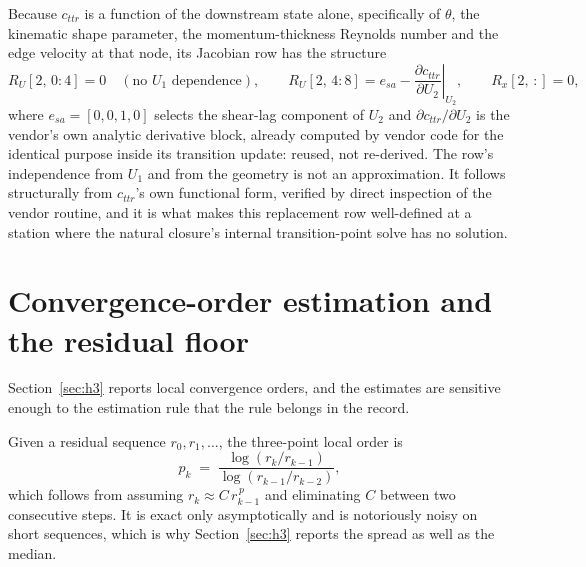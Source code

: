 Because $c_{ttr}$ is a function of the downstream state alone, specifically of
$\theta$, the kinematic shape parameter, the momentum-thickness Reynolds
number and the edge velocity at that node, its Jacobian row has the structure
\begin{equation}
  R_U[2,\,0{:}4] = 0 \quad(\text{no } U_1 \text{ dependence}), \qquad
  R_U[2,\,4{:}8] = e_{sa} - \left.\frac{\partial c_{ttr}}{\partial U_2}\right|_{U_2},
  \qquad R_x[2,\,:] = 0,
\end{equation}
where $e_{sa}=[0,0,1,0]$ selects the shear-lag component of $U_2$ and
$\partial c_{ttr}/\partial U_2$ is the vendor's own analytic derivative block,
already computed by vendor code for the identical purpose inside its
transition update: reused, not re-derived. The row's independence from $U_1$
and from the geometry is not an approximation. It follows structurally from
$c_{ttr}$'s own functional form, verified by direct inspection of the vendor
routine, and it is what makes this replacement row well-defined at a station
where the natural closure's internal transition-point solve has no solution.

\section{Convergence-order estimation and the residual floor}
\label{app:order}

Section~\ref{sec:h3} reports local convergence orders, and the estimates are
sensitive enough to the estimation rule that the rule belongs in the record.

Given a residual sequence $r_0, r_1, \dots$, the three-point local order is
\begin{equation}
  p_k \;=\; \frac{\log(r_k/r_{k-1})}{\log(r_{k-1}/r_{k-2})},
  \label{eq:order}
\end{equation}
which follows from assuming $r_k \approx C\,r_{k-1}^{\,p}$ and eliminating $C$
between two consecutive steps. It is exact only asymptotically and is
notoriously noisy on short sequences, which is why
Section~\ref{sec:h3} reports the spread as well as the median.

